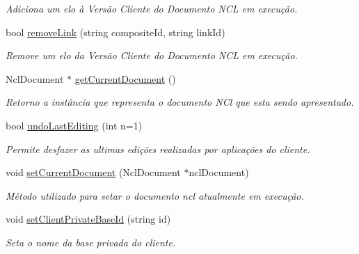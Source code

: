 \begin{DoxyCompactItemize}
\begin{DoxyCompactList}\small\item\em Adiciona um elo à Versão Cliente do Documento NCL em execução. \item\end{DoxyCompactList}\item 
bool \hyperlink{classbr_1_1ufscar_1_1lince_1_1ginga_1_1wac_1_1editing_1_1ClientEditingManager_a11e5f1029545aa4c0435094cc59477cb}{removeLink} (string compositeId, string linkId)
\begin{DoxyCompactList}\small\item\em Remove um elo da Versão Cliente do Documento NCL em execução. \item\end{DoxyCompactList}\item 
NclDocument $\ast$ \hyperlink{classbr_1_1ufscar_1_1lince_1_1ginga_1_1wac_1_1editing_1_1ClientEditingManager_a49b1b969381d54583a4c0ae61756ba7b}{getCurrentDocument} ()
\begin{DoxyCompactList}\small\item\em Retorno a instância que representa o documento NCl que esta sendo apresentado. \item\end{DoxyCompactList}\item 
bool \hyperlink{classbr_1_1ufscar_1_1lince_1_1ginga_1_1wac_1_1editing_1_1ClientEditingManager_a7094577521bafedebcd7edafe753774f}{undoLastEditing} (int n=1)
\begin{DoxyCompactList}\small\item\em Permite desfazer as ultimas edições realizadas por aplicações do cliente. \item\end{DoxyCompactList}\item 
void \hyperlink{classbr_1_1ufscar_1_1lince_1_1ginga_1_1wac_1_1editing_1_1ClientEditingManager_af64ee7af65344bf8c0eba75c33a9e29c}{setCurrentDocument} (NclDocument $\ast$nclDocument)
\begin{DoxyCompactList}\small\item\em Método utilizado para setar o documento ncl atualmente em execução. \item\end{DoxyCompactList}\item 
void \hyperlink{classbr_1_1ufscar_1_1lince_1_1ginga_1_1wac_1_1editing_1_1ClientEditingManager_a6a57699073fe086e75d16ffd96a5bfc3}{setClientPrivateBaseId} (string id)
\begin{DoxyCompactList}\small\item\em Seta o nome da base privada do cliente. \item\end{DoxyCompactList}\item 

\end{DoxyCompactItemize}
